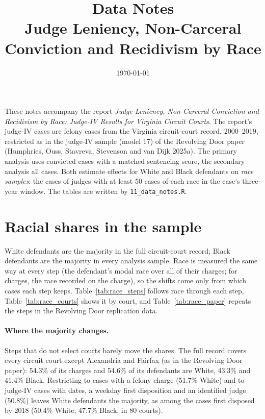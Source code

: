 \documentclass[11pt]{article}
\title{Data Notes\\[0.5ex]\large Judge Leniency, Non-Carceral Conviction and Recidivism by Race}
\date{\today}
\begin{document}
\maketitle

These notes accompany the report \emph{Judge Leniency, Non-Carceral Conviction and Recidivism by Race: Judge-IV Results for Virginia Circuit Courts}. The report's judge-IV cases are felony cases from the Virginia circuit-court record, 2000--2019, restricted as in the judge-IV sample (model 17) of the Revolving Door paper (Humphries, Ouss, Stavreva, Stevenson and van Dijk 2025a). The primary analysis uses convicted cases with a matched sentencing score, the secondary analysis all cases. Both estimate effects for White and Black defendants on \emph{race samples}: the cases of judges with at least 50 cases of each race in the case's three-year window. The tables are written by \texttt{11\_data\_notes.R}.

\section{Racial shares in the sample}\label{sec:racial_shares}

White defendants are the majority in the full circuit-court record; Black defendants are the majority in every analysis sample. Race is measured the same way at every step (the defendant's modal race over all of their charges; for charges, the race recorded on the charge), so the shifts come only from which cases each step keeps. Table~\ref{tab:race_steps} follows race through each step, Table~\ref{tab:race_courts} shows it by court, and Table~\ref{tab:race_paper} repeats the steps in the Revolving Door replication data.

\paragraph{Where the majority changes.} Steps that do not select courts barely move the shares. The full record covers every circuit court except Alexandria and Fairfax (as in the Revolving Door paper): 54.3\% of its charges and 54.6\% of its defendants are White, 43.3\% and 41.4\% Black. Restricting to cases with a felony charge (51.7\% White) and to judge-IV cases with dates, a weekday first disposition and an identified judge (50.8\%) leaves White defendants the majority, as among the cases first disposed by 2018 (50.4\% White, 47.7\% Black, in 80 courts).
\end{document}
